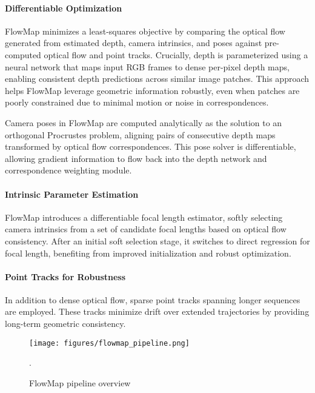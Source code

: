 \paragraph{Differentiable Optimization}
FlowMap minimizes a least-squares objective by comparing the optical flow generated from estimated depth, camera intrinsics, and poses against pre-computed optical flow and point tracks. 
Crucially, depth is parameterized using a neural network that maps input RGB frames to dense per-pixel depth maps, enabling consistent depth predictions across similar image patches. 
This approach helps FlowMap leverage geometric information robustly, even when patches are poorly constrained due to minimal motion or noise in correspondences.

Camera poses in FlowMap are computed analytically as the solution to an orthogonal Procrustes problem, aligning pairs of consecutive depth maps transformed by optical flow correspondences. 
This pose solver is differentiable, allowing gradient information to flow back into the depth network and correspondence weighting module.

\paragraph{Intrinsic Parameter Estimation}
FlowMap introduces a differentiable focal length estimator, softly selecting camera intrinsics from a set of candidate focal lengths based on optical flow consistency. 
After an initial soft selection stage, it switches to direct regression for focal length, benefiting from improved initialization and robust optimization.

\paragraph{Point Tracks for Robustness}
In addition to dense optical flow, sparse point tracks spanning longer sequences are employed. 
These tracks minimize drift over extended trajectories by providing long-term geometric consistency.

\begin{figure}[h]
    \centering
    \texttt{[image: figures/flowmap\_pipeline.png]}
    \caption{FlowMap pipeline overview \cite{smith24flowmap}}.
    \label{fig:flowmap}
\end{figure}

